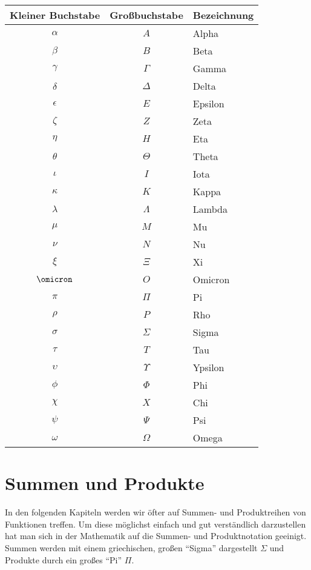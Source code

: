 \bigskip

\begin{center}
\begin{tabular}{c|c|l}
\hline
\textbf{Kleiner Buchstabe} & \textbf{Großbuchstabe} & \textbf{Bezeichnung} \\
\hline
$\alpha $ & $A $ & Alpha \\
$\beta $ & $B $ & Beta \\
$\gamma $ & $\Gamma $ & Gamma \\
$\delta $ & $\Delta $ & Delta \\
$\epsilon $ & $E $ & Epsilon \\
$\zeta $ & $Z $ & Zeta \\
$\eta $ & $H $ &  Eta\\
$\theta $ & $\Theta $ & Theta \\
$\iota $ & $I $ & Iota \\
$\kappa $ & $K $ & Kappa \\
$\lambda $ & $\Lambda $ & Lambda \\
$\mu $ & $M $ & Mu \\
$\nu $ & $N $ & Nu \\
$\xi $ & $\Xi $ &  Xi \\
$\omicron $ & $O $ & Omicron \\
$\pi $ & $\Pi $ & Pi \\
$\rho $ & $P $ & Rho \\
$\sigma $ & $\Sigma $ & Sigma  \\
$\tau $ & $T $ & Tau \\
$\upsilon $ & $\Upsilon $ & Ypsilon \\
$\phi $ & $\Phi $ & Phi \\
$\chi $ & $X $ & Chi \\
$\psi $ & $\Psi $ & Psi \\
$\omega $ & $\Omega $ & Omega \\
\hline
\end{tabular}
\end{center}


\section{Summen und Produkte}

In den folgenden Kapiteln werden wir öfter auf Summen- und Produktreihen von Funktionen treffen. Um diese möglichst einfach und gut verständlich darzustellen hat man sich in der Mathematik auf die Summen- und Produktnotation geeinigt. Summen werden mit einem griechischen, großen "`Sigma"' dargestellt $\Sigma$  und Produkte durch ein großes "`Pi"' $\Pi$. 

